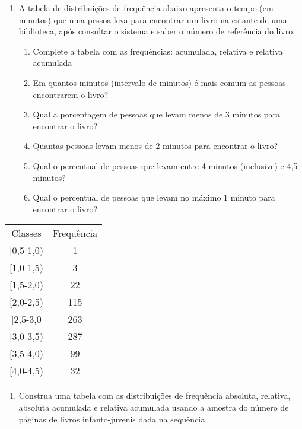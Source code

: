 \documentclass[]{article}
\providecommand{\tightlist}{%
  \setlength{\itemsep}{0pt}\setlength{\parskip}{0pt}}
\begin{document}
\begin{enumerate}
\def\labelenumi{\arabic{enumi}.}
\setcounter{enumi}{5}
\tightlist
\item
  A tabela de distribuições de frequência abaixo apresenta o tempo (em
  minutos) que uma pessoa leva para encontrar um livro na estante de uma
  biblioteca, após consultar o sistema e saber o número de referência do
  livro.

  \begin{enumerate}
  \def\labelenumii{(\alph{enumii})}
  \tightlist
  \item
    Complete a tabela com as frequências: acumulada, relativa e relativa
    acumulada
  \item
    Em quantos minutos (intervalo de minutos) é mais comum as pessoas
    encontrarem o livro?
  \item
    Qual a porcentagem de pessoas que levam menos de 3 minutos para
    encontrar o livro?
  \item
    Quantas pessoas levam menos de 2 minutos para encontrar o livro?
  \item
    Qual o percentual de pessoas que levam entre 4 minutos (inclusive) e
    4,5 minutos?
  \item
    Qual o percentual de pessoas que levam no máximo 1 minuto para
    encontrar o livro?
  \end{enumerate}
\end{enumerate}

\begin{table}[H]
\centering
\begin{tabular}{cc}
\hline
Classes     & Frequência \\ \cline{1-2}
{[}0,5-1,0) & 1          \\
{[}1,0-1,5) & 3          \\
{[}1,5-2,0) & 22         \\
{[}2,0-2,5) & 115        \\
{[}2,5-3,0  & 263        \\
{[}3,0-3,5) & 287        \\
{[}3,5-4,0) & 99         \\
{[}4,0-4,5) & 32         \\ \hline
\end{tabular}
\end{table}

\begin{enumerate}
\def\labelenumi{\arabic{enumi}.}
\setcounter{enumi}{6}
\tightlist
\item
  Construa uma tabela com as distribuições de frequência absoluta,
  relativa, absoluta acumulada e relativa acumulada usando a amostra do
  número de páginas de livros infanto-juvenis dada na sequência.
\end{enumerate}
\end{document}
